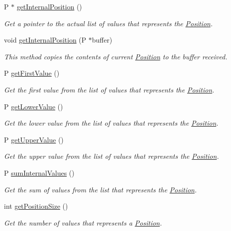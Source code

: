 \begin{DoxyCompactItemize}
P $\ast$ \hyperlink{structPosition_a807b3e89c1ddc702e0706a159a5c29d7}{get\+Internal\+Position} ()
\begin{DoxyCompactList}\small\item\em Get a pointer to the actual list of values that represents the \hyperlink{structPosition}{Position}. \end{DoxyCompactList}\item 
void \hyperlink{structPosition_a9c2340d3b1f5cb963202db0c9c29cdeb}{get\+Internal\+Position} (P $\ast$buffer)
\begin{DoxyCompactList}\small\item\em This method copies the contents of current \hyperlink{structPosition}{Position} to the buffer received. \end{DoxyCompactList}\item 
P \hyperlink{structPosition_ae2a4b11eb23489170b704f5edc00d334}{get\+First\+Value} ()
\begin{DoxyCompactList}\small\item\em Get the first value from the list of values that represents the \hyperlink{structPosition}{Position}. \end{DoxyCompactList}\item 
P \hyperlink{structPosition_a56d15266cecdd63cc07d6ec89f90fb4f}{get\+Lower\+Value} ()
\begin{DoxyCompactList}\small\item\em Get the lower value from the list of values that represents the \hyperlink{structPosition}{Position}. \end{DoxyCompactList}\item 
P \hyperlink{structPosition_a424b3d5791fcc593c743429e92817982}{get\+Upper\+Value} ()
\begin{DoxyCompactList}\small\item\em Get the upper value from the list of values that represents the \hyperlink{structPosition}{Position}. \end{DoxyCompactList}\item 
P \hyperlink{structPosition_a8f9b5812209642cb31de38d3745cfc16}{sum\+Internal\+Values} ()
\begin{DoxyCompactList}\small\item\em Get the sum of values from the list that represents the \hyperlink{structPosition}{Position}. \end{DoxyCompactList}\item 
int \hyperlink{structPosition_a535edee7c99f47e1ace160beceaf1256}{get\+Position\+Size} ()
\begin{DoxyCompactList}\small\item\em Get the number of values that represents a \hyperlink{structPosition}{Position}. \end{DoxyCompactList}\end{DoxyCompactItemize}

